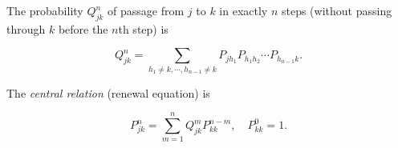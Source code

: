 The probability $Q_{jk}^n$ of passage from $j$ to $k$ in exactly $n$ steps (without passing through $k$ before the $n$th step) is

$$Q_{jk}^n = \sum_{h_1 \neq k, \cdots, h_{n-1} \neq k} P_{j h_1} P_{h_1 h_2} \cdots P_{h_{n-1} k}.$$

The \textit{central relation} (renewal equation) is

$$P_{jk}^n = \sum_{m=1}^{n} Q_{jk}^m P_{kk}^{n-m}, \quad P_{kk}^0 = 1.$$
